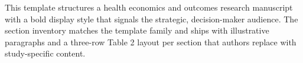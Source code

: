 
This template structures a health economics and outcomes research manuscript with a bold display style that signals the strategic, decision-maker audience. The section inventory matches the template family and ships with illustrative paragraphs and a three-row Table 2 layout per section that authors replace with study-specific content.
